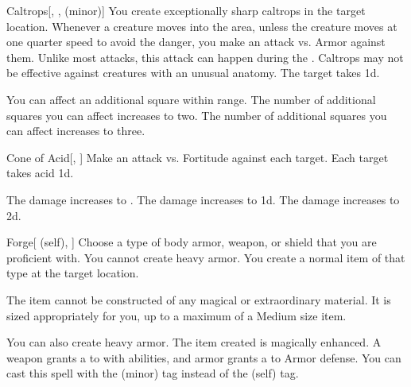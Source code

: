 \lowercase{\hypertarget{spell:Caltrops}{}}\label{spell:Caltrops}
\begin{freeability}[Rank 1]{\hypertarget{spell:Caltrops}{Caltrops}}[, ,  (minor)]
You create exceptionally sharp caltrops in the target location.
Whenever a creature moves into the area, unless the creature moves at one quarter speed to avoid the danger, you make an attack vs. Armor against them.
Unlike most attacks, this attack can happen during the .
Caltrops may not be effective against creatures with an unusual anatomy.
\hit The target takes  \minus1d.

\rankline
{} You can affect an additional square within range.
 The number of additional squares you can affect increases to two.
 The number of additional squares you can affect increases to three.
\end{freeability}
\vspace{0.25em}



\lowercase{\hypertarget{spell:Cone of Acid}{}}\label{spell:Cone of Acid}
\begin{freeability}[Rank 1]{\hypertarget{spell:Cone of Acid}{Cone of Acid}}[, ]
Make an attack vs. Fortitude against each target.
\hit Each target takes acid  \minus1d.

\rankline
{} The damage increases to .
 The damage increases to  \plus1d.
 The damage increases to  \plus2d.
\end{freeability}
\vspace{0.25em}



\lowercase{\hypertarget{spell:Forge}{}}\label{spell:Forge}
\begin{attuneability}[Rank 1]{\hypertarget{spell:Forge}{Forge}}[ (self), ]
Choose a type of body armor, weapon, or shield that you are proficient with.
You cannot create heavy armor.
You create a normal item of that type at the target location.

The item cannot be constructed of any magical or extraordinary material.
It is sized appropriately for you, up to a maximum of a Medium size item.

\rankline
{} You can also create heavy armor.
 The item created is magically enhanced.
A weapon grants a   to  with  abilities,
and armor grants a   to Armor defense.
 You can cast this spell with the  (minor) tag instead of the  (self) tag.
\end{attuneability}
\vspace{0.25em}



